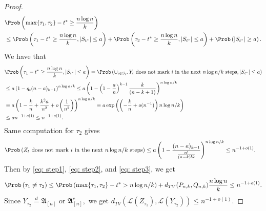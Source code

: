 \begin{proof}
\begin{equation}
    \begin{aligned}
        &\Prob\left(\max\{ \tau_1, \tau_2\} - t^* \geq \frac{n\log n}{k} \right)\\ 
        &\leq \Prob\left( \tau_1 - t^* \geq \frac{n\log n}{k}, |S_{t^{*}}| \leq a \right) + \Prob\left( \tau_2 - t^* \geq \frac{n\log n}{k}, |S_{t^{*}}| \leq a \right)+\Prob\left(|S_{t^*}| \geq a\right).\\
    \end{aligned}
\end{equation}
We have that 
\begin{equation}\label{eq: step2}
    \begin{aligned}
        &\Prob\left( \tau_1 - t^* \geq \frac{n\log n}{k}, |S_{t^{*}}| \leq a \right) = \Prob\left(\cup_{i \in S_{t^*}} Y_t \text{ does not mark } i \text{ in the next } n\log n/k \text{ steps} , |S_{t^{*}}|
        \leq a \right) \\
        &\leq a \left(1-q_t(n-a)_{k-1}\right)^{n\log n/k} 
        \leq a\left(1-\left(1-\frac{a}{n}\right)^{k-1} \frac{k}{(n-k+1)}\right)^{n\log n/k}\\
        &= a\left(1-\frac{k}{n} + \frac{k^2a}{n^2} + o\left(\frac{1}{n^2}\right)\right)^{n\log n /k}
        = a\exp\left( \left(- \frac{k}{n} + o(n^{-1})\right)n\log n/k\right)\\ &\leq an^{-1 + o(1)}\leq  n^{-1 +o(1)}.
    \end{aligned}
\end{equation}
Same computation for $\tau_2$ gives
\begin{equation}\label{eq: step3}
    \begin{aligned}
        &\Prob\left(Z_t \text{ does not mark }i \text{ in the next } n\log n/k \text{ steps}\right) \leq a\left(1-\frac{(n-a)_{k-1}}{\frac{n!}{(n-k)!k}}\right)^{n\log n/k}\leq n^{-1+o(1)}.
    \end{aligned}
\end{equation}
Then by \eqref{eq: step1}, \eqref{eq: step2}, and \eqref{eq: step3}, we get
\begin{equation}
    \begin{aligned}
        \Prob\left(\tau_1 \neq \tau_2\right) \leq \Prob\left(\max \{\tau_1, \tau_2 \} - t^*> n\log n/k\right) + d_{TV}(P_{n,k},Q_{n,k}) \frac{n\log n}{k} \leq n^{-1+o(1)}.
    \end{aligned}
\end{equation}
Since $Y_{\tau_2} \stackrel{d}{=} \mathfrak{A}_{[n]} \text{ or } \mathfrak{A}_{[n]}^c,$ we get $d_{TV}(\mathcal{L}(Z_{\tau_1}), \mathcal{L}(Y_{\tau_2})) \leq n^{-1+o(1)}$.
\end{proof}
